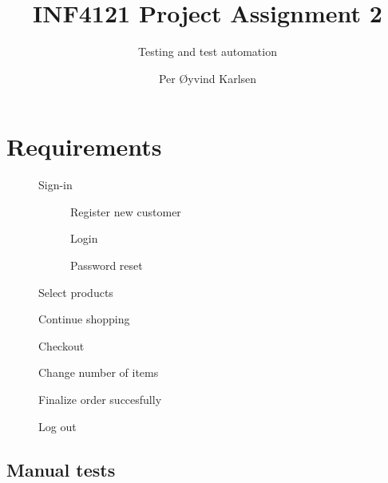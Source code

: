\documentclass[USenglish]{article}
\title{INF4121 Project Assignment 2}
\subtitle{Testing and test automation}
\author{Per Øyvind Karlsen}
\begin{document}
\ififorside

\section{Requirements}

\begin{description}
  \item[] Sign-in
  \begin{description}
	  \item[] Register new customer
	  \item[] Login
	  \item[] Password reset
  \end{description}
  \item[] Select products
  \item[] Continue shopping
  \item[] Checkout
  \item[] Change number of items
  \item[] Finalize order succesfully
  \item[] Log out
\end{description}

\subsection{Manual tests}
\end{document}

